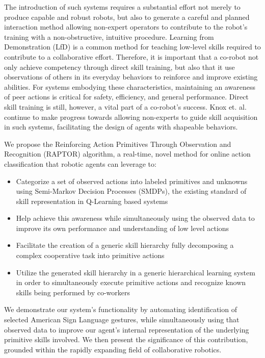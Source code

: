 \documentclass[letterpaper]{article}
\begin{document}
  The introduction of such systems requires a substantial effort not merely to produce capable and robust robots, but also to generate a careful and planned interaction method allowing non-expert operators to contribute to the robot's training with a non-obstructive, intuitive procedure.  Learning from Demonstration (LfD) \cite{LFDSurvey} is a common method for teaching low-level skills required to contribute to a collaborative effort.  Therefore, it is important that a co-robot not only achieve competency through direct skill training, but also that it use observations of others in its everyday behaviors to reinforce and improve existing abilities.  For systems embodying these characteristics, maintaining an awareness of peer actions is critical for safety, efficiency, and general performance. Direct skill training is still, however, a vital part of a co-robot's success.  Knox et. al.  continue to make progress towards allowing non-experts to guide skill acquisition in such systems, facilitating the design of agents with shapeable behaviors.
  
  We propose the Reinforcing Action Primitives Through Observation and Recognition (RAPTOR) algorithm, a real-time, novel method for online action classification that robotic agents can leverage to:
  \begin{itemize}
    \item Categorize a set of observed actions into labeled primitives and unknowns using Semi-Markov Decision Processes (SMDPs), the existing standard of skill representation in Q-Learning based systems \cite{SuttonMDP}
    \item Help achieve this awareness while simultaneously using the observed data to improve its own performance and understanding of low level actions
    \item Facilitate the creation of a generic skill hierarchy fully decomposing a complex cooperative 
task into primitive actions
    \item Utilize the generated skill hierarchy in a generic hierarchical learning system in order to simultaneously execute primitive actions and recognize known skills being performed by co-workers
  \end{itemize}

  We demonstrate our system's functionality by automating identification of selected American Sign Language gestures, while simultaneously using that observed data to improve our agent's internal representation of the underlying primitive skills involved. We then present the significance of this contribution, grounded within the rapidly expanding field of collaborative robotics.
\end{document}
